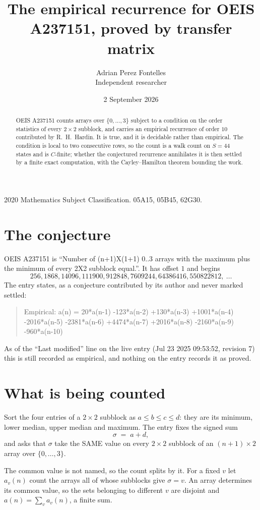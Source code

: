 \documentclass[11pt,a4paper]{article}
\title{The empirical recurrence for OEIS A237151, proved by transfer matrix}
\author{Adrian Perez Fontelles\\ \small Independent researcher}
\date{2 September 2026}
\theoremstyle{plain}
\theoremstyle{definition}
\begin{document}
\maketitle

\begin{abstract}
OEIS A237151 counts arrays over $\{0,\dots,3\}$ subject to a condition on the order
statistics of every $2\times2$ subblock, and carries an empirical recurrence of order
$10$ contributed by R.~H.~Hardin. It is true, and it is decidable rather than empirical.
The condition is local to two consecutive rows, so the count is a walk count on $S=44$
states and is $C$-finite; whether the conjectured recurrence annihilates it is then settled by
a finite exact computation, with the Cayley--Hamilton theorem bounding the work.
\end{abstract}

\noindent\small 2020 Mathematics Subject Classification. 05A15, 05B45, 62G30.\normalsize

\section{The conjecture}

OEIS A237151 is ``Number of (n+1)X(1+1) 0..3 arrays with the maximum plus the minimum of every 2X2 subblock equal.''. It has offset $1$ and begins
\[
256, 1868, 14096, 111900, 912848, 7609244, 64386416, 550822812,\ \dots
\]
The entry states, as a conjecture contributed by its author and never marked settled:
\begin{quote}
Empirical: a(n) = 20*a(n-1) -123*a(n-2) +130*a(n-3) +1001*a(n-4) -2016*a(n-5) -2381*a(n-6) +4474*a(n-7) +2016*a(n-8) -2160*a(n-9) -960*a(n-10)
\end{quote}
As of the ``Last modified'' line on the live entry (Jul 23 2025 09:53:52, revision 7) this is still
recorded as empirical, and nothing on the entry records it as proved.

\section{What is being counted}

Sort the four entries of a $2\times2$ subblock as $a\le b\le c\le d$: they
are its minimum, lower median, upper median and maximum. The entry fixes the signed sum
\[
\sigma\;=\;a+d,
\]
and asks that $\sigma$ take the SAME value on every $2\times2$ subblock of an
$(n+1)\times2$ array over $\{0,\dots,3\}$.

The common value is not named, so the count splits by it. For a fixed $v$ let $a_v(n)$ count
the arrays all of whose subblocks give $\sigma=v$. An array determines its common value, so
the sets belonging to different $v$ are disjoint and $a(n)=\sum_v a_v(n)$, a finite sum.
\end{document}
